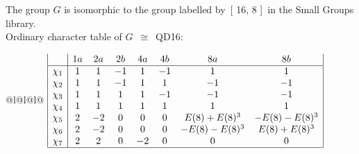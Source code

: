\documentclass[varwidth=\maxdimen,border=10]{standalone}
\begin{document}
The group $G$ is isomorphic to the group labelled by\ [ 16, 8 ]\ in the Small Groups library.\\
Ordinary character table of $G$\ $\cong$\ QD16:\\
\begin{center}
\begin{tabular}{@{}l@{}l@{}l@{}}
\hline
\(\begin{array}{|l|ccccccc|}
  & 1a & 2a & 2b & 4a & 4b & 8a & 8b\\ \hline
\chi_{1} & 1 & 1 & -1 & 1 & -1 & 1 & 1\\
\chi_{2} & 1 & 1 & -1 & 1 & 1 & -1 & -1\\
\chi_{3} & 1 & 1 & 1 & 1 & -1 & -1 & -1\\
\chi_{4} & 1 & 1 & 1 & 1 & 1 & 1 & 1\\
\chi_{5} & 2 & -2 & 0 & 0 & 0 & E(8)+E(8)^{3} & -E(8)-E(8)^{3}\\
\chi_{6} & 2 & -2 & 0 & 0 & 0 & -E(8)-E(8)^{3} & E(8)+E(8)^{3}\\
\chi_{7} & 2 & 2 & 0 & -2 & 0 & 0 & 0\\
\hline
\end{array}\)\\
\end{tabular}
\end{center}
\end{document}
